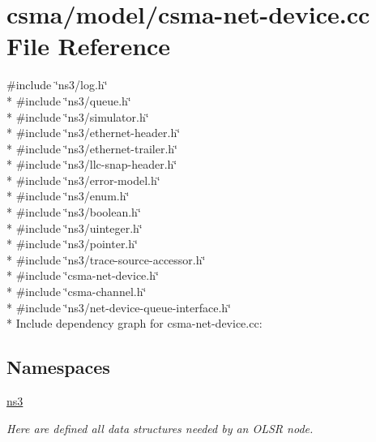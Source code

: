 \hypertarget{csma-net-device_8cc}{}\section{csma/model/csma-\/net-\/device.cc File Reference}
\label{csma-net-device_8cc}
{\ttfamily \#include \char`\"{}ns3/log.\+h\char`\"{}}\\*
{\ttfamily \#include \char`\"{}ns3/queue.\+h\char`\"{}}\\*
{\ttfamily \#include \char`\"{}ns3/simulator.\+h\char`\"{}}\\*
{\ttfamily \#include \char`\"{}ns3/ethernet-\/header.\+h\char`\"{}}\\*
{\ttfamily \#include \char`\"{}ns3/ethernet-\/trailer.\+h\char`\"{}}\\*
{\ttfamily \#include \char`\"{}ns3/llc-\/snap-\/header.\+h\char`\"{}}\\*
{\ttfamily \#include \char`\"{}ns3/error-\/model.\+h\char`\"{}}\\*
{\ttfamily \#include \char`\"{}ns3/enum.\+h\char`\"{}}\\*
{\ttfamily \#include \char`\"{}ns3/boolean.\+h\char`\"{}}\\*
{\ttfamily \#include \char`\"{}ns3/uinteger.\+h\char`\"{}}\\*
{\ttfamily \#include \char`\"{}ns3/pointer.\+h\char`\"{}}\\*
{\ttfamily \#include \char`\"{}ns3/trace-\/source-\/accessor.\+h\char`\"{}}\\*
{\ttfamily \#include \char`\"{}csma-\/net-\/device.\+h\char`\"{}}\\*
{\ttfamily \#include \char`\"{}csma-\/channel.\+h\char`\"{}}\\*
{\ttfamily \#include \char`\"{}ns3/net-\/device-\/queue-\/interface.\+h\char`\"{}}\\*
Include dependency graph for csma-\/net-\/device.cc\+:
\subsection*{Namespaces}
\begin{DoxyCompactItemize}
\item 
 \hyperlink{namespacens3}{ns3}
\begin{DoxyCompactList}\small\item\em Here are defined all data structures needed by an O\+L\+SR node. \end{DoxyCompactList}\end{DoxyCompactItemize}
